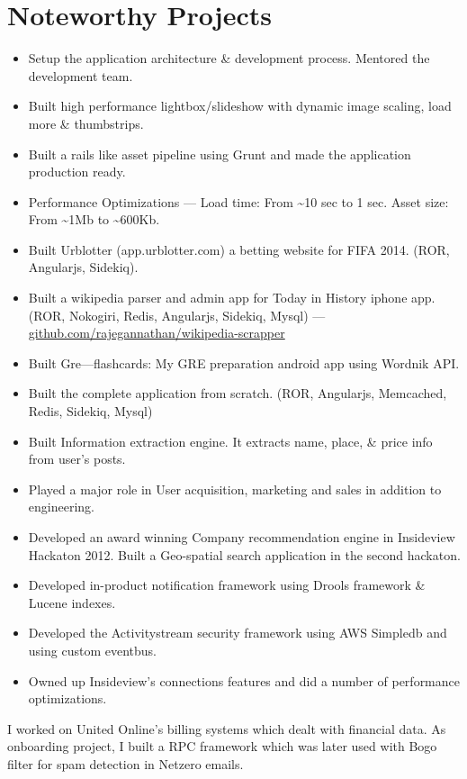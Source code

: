 \documentclass{resume}
\begin{document}
\section{Noteworthy Projects}

\begin{itemize} \itemsep1pt \parskip0pt
  \item Setup the application architecture \& development process. Mentored the development team.
  \item Built high performance lightbox/slideshow with dynamic image scaling, load more \& thumbstrips.
  \item Built a rails like asset pipeline using Grunt and made the application production ready.
  \item Performance Optimizations --- Load time: From \textasciitilde10 sec to 1 sec.  Asset size: From \textasciitilde1Mb to \textasciitilde600Kb.
\end{itemize}
\begin{itemize} \itemsep1pt \parskip0pt
  \item Built Urblotter (app.urblotter.com) a betting website for FIFA 2014. (ROR, Angularjs, Sidekiq).
  \item Built a wikipedia parser and admin app for Today in History iphone app. (ROR, Nokogiri, Redis, Angularjs, Sidekiq, Mysql) --- \url{github.com/rajegannathan/wikipedia-scrapper}
  \item Built Gre---flashcards: My GRE preparation android app using Wordnik API\@.
\end{itemize}
\begin{itemize} \itemsep1pt \parskip0pt
  \item Built the complete application from scratch. (ROR, Angularjs, Memcached, Redis, Sidekiq, Mysql)
  \item Built Information extraction engine. It extracts name, place, \& price info from user's posts.
  \item Played a major role in User acquisition, marketing and sales in addition to engineering. 
\end{itemize}
\begin{itemize} \itemsep1pt \parskip0pt
  \item Developed an award winning Company recommendation engine in Insideview Hackaton 2012.  Built a Geo-spatial search application in the second hackaton.
  \item Developed in-product notification framework using Drools framework \& Lucene indexes.
  \item Developed the Activitystream security framework using AWS Simpledb and using custom eventbus.
  \item Owned up Insideview's connections features and did a number of performance optimizations.
\end{itemize}
I worked on United Online's billing systems which dealt with financial data.  As onboarding project, I built a RPC framework which was later used with Bogo filter for spam detection in Netzero emails.
\end{document}
